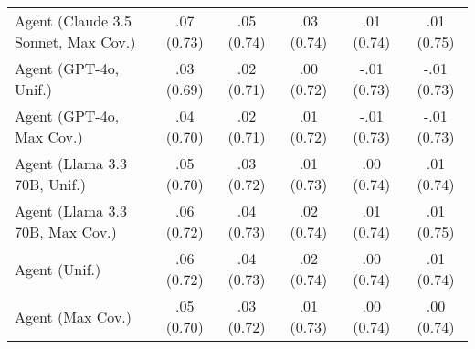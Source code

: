 \begin{table}[h!]
\begin{tabular}{lccccc}
    Agent (Claude 3.5 Sonnet, Max Cov.) & \cellcolor{gold!30}.07 {\small (0.73)} & \cellcolor{gold!30}.05 {\small (0.74)} & \cellcolor{gold!30}.03 {\small (0.74)} & \cellcolor{gold!30}.01 {\small (0.74)} & \cellcolor{gold!30}.01 {\small (0.75)} \\
    Agent (GPT-4o, Unif.) & .03 {\small (0.69)} & .02 {\small (0.71)} & .00 {\small (0.72)} & -.01 {\small (0.73)} & -.01 {\small (0.73)} \\
    Agent (GPT-4o, Max Cov.) & .04 {\small (0.70)} & .02 {\small (0.71)} & .01 {\small (0.72)} & -.01 {\small (0.73)} & -.01 {\small (0.73)} \\
    Agent (Llama 3.3 70B, Unif.) & .05 {\small (0.70)} & .03 {\small (0.72)} & .01 {\small (0.73)} & .00 {\small (0.74)} & .01 {\small (0.74)} \\
    Agent (Llama 3.3 70B, Max Cov.) & .06 {\small (0.72)} & .04 {\small (0.73)} & .02 {\small (0.74)} & \cellcolor{bronze!30}.01 {\small (0.74)} & \cellcolor{bronze!30}.01 {\small (0.75)} \\
    Agent (Unif.) & .06 {\small (0.72)} & .04 {\small (0.73)} & .02 {\small (0.74)} & .00 {\small (0.74)} & .01 {\small (0.74)} \\
    Agent (Max Cov.) & .05 {\small (0.70)} & .03 {\small (0.72)} & .01 {\small (0.73)} & .00 {\small (0.74)} & .00 {\small (0.74)} \\
    \bottomrule
    \end{tabular}
\end{table}